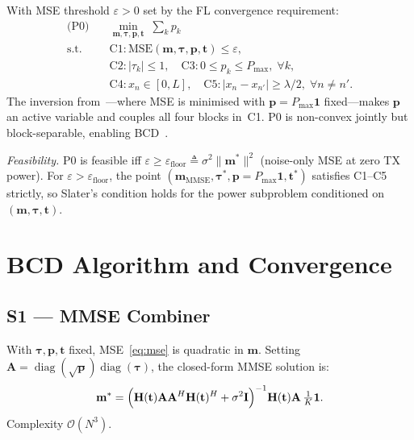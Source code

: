 \documentclass[journal,letterpaper,10pt,twocolumn]{IEEEtran}
\begin{document}
With MSE threshold $\varepsilon\!>\!0$ set by the FL convergence
requirement:
\begin{align}
  \text{(P0)}\quad &\min_{\mathbf{m},\boldsymbol{\tau},\mathbf{p},\mathbf{t}}
  \;\sum_{k} p_{k} \label{eq:P0obj}\\
  \text{s.t.}\quad
  &\text{C1}: \text{MSE}(\mathbf{m},\boldsymbol{\tau},\mathbf{p},\mathbf{t})\leq\varepsilon,
  \label{eq:C1}\\
  &\text{C2}: |\tau_{k}|\leq 1,\quad
   \text{C3}: 0\leq p_{k}\leq P_{\max},\;\forall k, \label{eq:C23}\\
  &\text{C4}: x_{n}\!\in\![0,L],\quad
   \text{C5}: |x_{n}-x_{n'}|\geq\lambda/2,\;\forall n\!\neq\!n'.
  \label{eq:C45}
\end{align}
The inversion from~\cite{Zhang2024}---where MSE is minimised with
$\mathbf{p}\!=\!P_{\max}\mathbf{1}$ fixed---makes $\mathbf{p}$ an
active variable and couples all four blocks in~C1. P0 is non-convex
jointly but block-separable, enabling BCD~\cite{Tseng2001}.

\textit{Feasibility.} P0 is feasible iff
$\varepsilon\geq\varepsilon_{\text{floor}}\!\triangleq\!\sigma^{2}\|\mathbf{m}^{*}\|^{2}$
(noise-only MSE at zero TX power). For
$\varepsilon\!>\!\varepsilon_{\text{floor}}$, the point
$(\mathbf{m}_{\text{MMSE}},\boldsymbol{\tau}^{*},\mathbf{p}\!=\!P_{\max}\mathbf{1},\mathbf{t}^{*})$
satisfies C1--C5 strictly, so Slater's condition holds for the power
subproblem conditioned on $(\mathbf{m},\boldsymbol{\tau},\mathbf{t})$.

\section{BCD Algorithm and Convergence}

\subsection{S1 --- MMSE Combiner}

With $\boldsymbol{\tau},\mathbf{p},\mathbf{t}$ fixed, MSE~\eqref{eq:mse}
is quadratic in $\mathbf{m}$. Setting
$\mathbf{A}\!=\!\operatorname{diag}(\sqrt{\mathbf{p}})\operatorname{diag}(\boldsymbol{\tau})$,
the closed-form MMSE solution is:
\begin{equation}
  \mathbf{m}^{*} = \Bigl(\mathbf{H}(\mathbf{t})\mathbf{A}\mathbf{A}^{H}
  \mathbf{H}(\mathbf{t})^{H}+\sigma^{2}\mathbf{I}\Bigr)^{-1}
  \mathbf{H}(\mathbf{t})\mathbf{A}\,\tfrac{1}{K}\mathbf{1}.
  \label{eq:mmse}
\end{equation}
Complexity $\mathcal{O}(N^{3})$.
\end{document}
